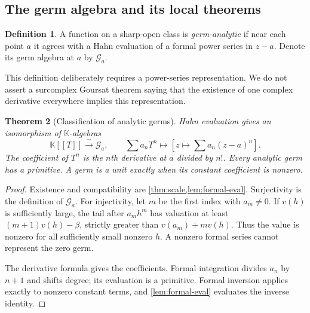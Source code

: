 \documentclass[11pt,a4paper]{article}
\numberwithin{equation}{section}
\newtheorem{theorem}{Theorem}[section]
\theoremstyle{definition}
\newtheorem{definition}[theorem]{Definition}
\newcommand{\K}{\mathbb K}
\newcommand{\GG}{\mathscr G}
\begin{document}
\subsection{The germ algebra and its local theorems}

\begin{definition}
A function on a sharp-open class is \emph{germ-analytic} if near each point
$a$ it agrees with a Hahn evaluation of a formal power series in $z-a$.
Denote its germ algebra at $a$ by $\GG_a$.
\end{definition}

This definition deliberately requires a power-series representation.
We do not assert a surcomplex Goursat theorem saying that the existence of
one complex derivative everywhere implies this representation.

\begin{theorem}[Classification of analytic germs]\label{thm:germs}
Hahn evaluation gives an isomorphism of $\K$-algebras
\[
 \K[[T]]\xrightarrow{\ \sim\ }\GG_a,
 \qquad \sum a_nT^n\longmapsto\left[z\mapsto\sum a_n(z-a)^n\right].
\]
The coefficient of $T^n$ is the $n$th derivative at $a$ divided by $n!$.
Every analytic germ has a primitive. A germ is a unit exactly when its
constant coefficient is nonzero.
\end{theorem}
\begin{proof}
Existence and compatibility are \cref{thm:scale,lem:formal-eval}.
Surjectivity is the definition of $\GG_a$. For injectivity, let $m$ be the
first index with $a_m\neq0$. If $v(h)$ is sufficiently large, the tail after
$a_mh^m$ has valuation at least $(m+1)v(h)-\beta$, strictly greater than
$v(a_m)+mv(h)$. Thus the value is nonzero for all sufficiently small nonzero
$h$. A nonzero formal series cannot represent the zero germ.

The derivative formula gives the coefficients. Formal integration divides
$a_n$ by $n+1$ and shifts degree; its evaluation is a primitive.
Formal inversion applies exactly to nonzero constant terms, and
\cref{lem:formal-eval} evaluates the inverse identity.
\end{proof}
\end{document}
